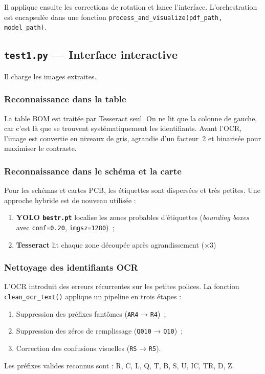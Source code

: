 \documentclass[a4paper,11pt]{article} %
\begin{document}
Il applique ensuite les corrections de rotation et lance l'interface.
L'orchestration est encapsulée dans une fonction \texttt{process\_and\_visualize(pdf\_path, model\_path)}.

\subsection{\texttt{test1.py} --- Interface interactive}

Il charge les images extraites.

\subsubsection{Reconnaissance dans la table}

La table BOM est traitée par Tesseract seul.
On ne lit que la colonne de gauche, car c'est là que se trouvent systématiquement les identifiants.
Avant l'OCR, l'image est convertie en niveaux de gris, agrandie d'un facteur~2
et binarisée pour maximiser le contraste.

\subsubsection{Reconnaissance dans le schéma et la carte}

Pour les schémas et cartes PCB, les étiquettes sont dispersées et très petites.
Une approche hybride est de nouveau utilisée :
\begin{enumerate}
  \item \textbf{YOLO \texttt{bestr.pt}} localise les zones probables d'étiquettes
        (\textit{bounding boxes} avec \texttt{conf=0.20}, \texttt{imgsz=1280})~;
  \item \textbf{Tesseract} lit chaque zone découpée après agrandissement (\(\times 3\))
\end{enumerate}

\subsubsection{Nettoyage des identifiants OCR}

L'OCR introduit des erreurs récurrentes sur les petites polices.
La fonction \texttt{clean\_ocr\_text()} applique un pipeline en trois étapes :
\begin{enumerate}
  \item Suppression des préfixes fantômes (\texttt{AR4} → \texttt{R4})~;
  \item Suppression des zéros de remplissage (\texttt{Q010} → \texttt{Q10})~;
  \item Correction des confusions visuelles (\texttt{RS} → \texttt{R5}).
\end{enumerate}
Les préfixes valides reconnus sont : R, C, L, Q, T, B, S, U, IC, TR, D, Z.
\end{document}
